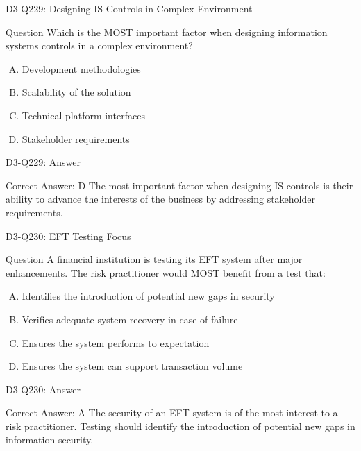 \documentclass{beamer}
\begin{document}
	\begin{frame}{D3-Q229: Designing IS Controls in Complex Environment}
		\begin{block}{Question}
			Which is the MOST important factor when designing information systems controls in a complex environment?
		\end{block}
		\begin{enumerate}[(A)]
			\item Development methodologies
			\item Scalability of the solution
			\item Technical platform interfaces
			\item Stakeholder requirements
		\end{enumerate}
	\end{frame}
	\begin{frame}{D3-Q229: Answer}
		\begin{block}{Correct Answer: D}
			The most important factor when designing IS controls is their ability to advance the interests of the business by addressing stakeholder requirements.
		\end{block}
	\end{frame}
	
	\begin{frame}{D3-Q230: EFT Testing Focus}
		\begin{block}{Question}
			A financial institution is testing its EFT system after major enhancements. The risk practitioner would MOST benefit from a test that:
		\end{block}
		\begin{enumerate}[(A)]
			\item Identifies the introduction of potential new gaps in security
			\item Verifies adequate system recovery in case of failure
			\item Ensures the system performs to expectation
			\item Ensures the system can support transaction volume
		\end{enumerate}
	\end{frame}
	\begin{frame}{D3-Q230: Answer}
		\begin{block}{Correct Answer: A}
			The security of an EFT system is of the most interest to a risk practitioner. Testing should identify the introduction of potential new gaps in information security.
		\end{block}
	\end{frame}
	
\end{document}
